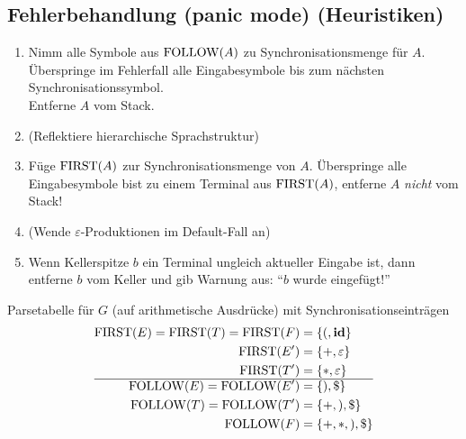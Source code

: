 \subsection{Fehlerbehandlung (panic mode) (Heuristiken)}
\begin{enumerate}
 \item Nimm alle Symbole aus $\operatorname{FOLLOW}(A)$ zu Synchronisationsmenge für $A$. \\
       Überspringe im Fehlerfall alle Eingabesymbole bis zum nächsten Synchronisationssymbol. \\
       Entferne $A$ vom Stack.
 \item (Reflektiere hierarchische Sprachstruktur)
 \item Füge $\operatorname{FIRST}(A)$ zur Synchronisationsmenge von $A$. Überspringe alle Eingabesymbole bist zu einem Terminal aus $\operatorname{FIRST}(A)$, entferne $A$ \emph{nicht} vom Stack!
 \item (Wende $\varepsilon$-Produktionen im Default-Fall an)
 \item Wenn Kellerspitze $b$ ein Terminal ungleich aktueller Eingabe ist, dann entferne $b$ vom Keller und gib Warnung aus: "`$b$ wurde eingefügt!"'
\end{enumerate}

Parsetabelle für $G$ (auf arithmetische Ausdrücke) mit Synchronisationseinträgen
\begin{align*}
 \operatorname{FIRST}(E) = \operatorname{FIRST}(T) = \operatorname{FIRST}(F) &= \{(,\textbf{id}\} \\
 \operatorname{FIRST}(E') &= \{+,\varepsilon\} \\
 \operatorname{FIRST}(T') &= \{*,\varepsilon\} \\\hline
 \operatorname{FOLLOW}(E) = \operatorname{FOLLOW}(E') &= \{),\$\} \\
 \operatorname{FOLLOW}(T) = \operatorname{FOLLOW}(T') &= \{+,),\$\} \\
 \operatorname{FOLLOW}(F) &= \{+, *, ), \$\}
\end{align*}

